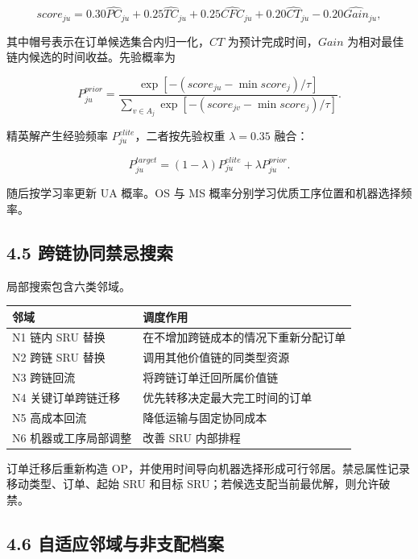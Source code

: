 \documentclass[UTF8,11pt]{ctexart}
\begin{document}
\[
score_{ju}=
0.30\widehat{PC}_{ju}
+0.25\widehat{TC}_{ju}
+0.25\widehat{CFC}_{ju}
+0.20\widehat{CT}_{ju}
-0.20\widehat{Gain}_{ju},
\]

其中帽号表示在订单候选集合内归一化，\(CT\) 为预计完成时间，\(Gain\) 为相对最佳链内候选的时间收益。先验概率为

\[
P^{prior}_{ju}=
\frac{\exp[-(score_{ju}-\min score_j)/\tau]}
{\sum_{v\in A_j}\exp[-(score_{jv}-\min score_j)/\tau]}.
\]

精英解产生经验频率 \(P^{elite}_{ju}\)，二者按先验权重 \(\lambda=0.35\) 融合：

\[
P^{target}_{ju}=(1-\lambda)P^{elite}_{ju}+\lambda P^{prior}_{ju}.
\]

随后按学习率更新 UA 概率。OS 与 MS 概率分别学习优质工序位置和机器选择频率。

\subsection*{4.5 跨链协同禁忌搜索}

局部搜索包含六类邻域。

\begin{table}[H]
\centering
\small
\begin{tabularx}{\textwidth}{>{\raggedright\arraybackslash}p{} >{\raggedright\arraybackslash}X}
\toprule
邻域 & 调度作用 \\
\midrule
N1 链内 SRU 替换 & 在不增加跨链成本的情况下重新分配订单 \\
N2 跨链 SRU 替换 & 调用其他价值链的同类型资源 \\
N3 跨链回流 & 将跨链订单迁回所属价值链 \\
N4 关键订单跨链迁移 & 优先转移决定最大完工时间的订单 \\
N5 高成本回流 & 降低运输与固定协同成本 \\
N6 机器或工序局部调整 & 改善 SRU 内部排程 \\
\bottomrule
\end{tabularx}
\end{table}

订单迁移后重新构造 OP，并使用时间导向机器选择形成可行邻居。禁忌属性记录移动类型、订单、起始 SRU 和目标 SRU；若候选支配当前最优解，则允许破禁。

\subsection*{4.6 自适应邻域与非支配档案}
\end{document}
